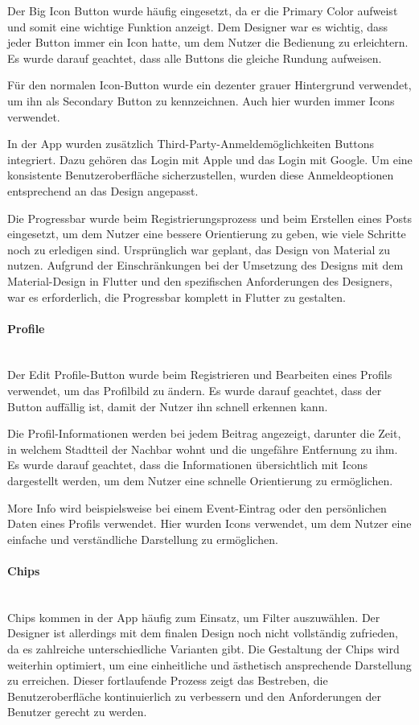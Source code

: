 Der Big Icon Button wurde häufig eingesetzt, da er die Primary Color aufweist und somit eine wichtige Funktion anzeigt. Dem Designer war es wichtig, dass jeder Button immer ein Icon hatte, um dem Nutzer die Bedienung zu erleichtern. Es wurde darauf geachtet, dass alle Buttons die gleiche Rundung aufweisen.

Für den normalen Icon-Button wurde ein dezenter grauer Hintergrund verwendet, um ihn als Secondary Button zu kennzeichnen. Auch hier wurden immer Icons verwendet.

In der App wurden zusätzlich Third-Party-Anmeldemöglichkeiten Buttons integriert. Dazu gehören das Login mit Apple und das Login mit Google. Um eine konsistente Benutzeroberfläche sicherzustellen, wurden diese Anmeldeoptionen entsprechend an das Design angepasst.

Die Progressbar wurde beim Registrierungsprozess und beim
Erstellen eines Posts eingesetzt, um dem Nutzer eine bessere
Orientierung zu geben, wie viele Schritte noch zu erledigen
sind. Ursprünglich war geplant, das Design von Material zu
nutzen. Aufgrund der Einschränkungen bei der Umsetzung des
Designs mit dem Material-Design in Flutter und den spezifischen
Anforderungen des Designers, war es erforderlich, die
Progressbar komplett in Flutter zu gestalten.

\paragraph{Profile}\mbox{} \\
Der Edit Profile-Button wurde beim Registrieren und
Bearbeiten eines Profils verwendet, um das Profilbild
zu ändern. Es wurde darauf geachtet, dass der Button
auffällig ist, damit der Nutzer ihn schnell erkennen kann.

Die Profil-Informationen werden bei jedem Beitrag angezeigt,
darunter die Zeit, in welchem Stadtteil der Nachbar wohnt
und die ungefähre Entfernung zu ihm. Es wurde darauf
geachtet, dass die Informationen übersichtlich mit
Icons dargestellt werden, um dem Nutzer eine schnelle Orientierung
zu ermöglichen.

More Info wird beispielsweise bei einem Event-Eintrag oder
den persönlichen Daten eines Profils verwendet. Hier wurden
Icons verwendet, um dem Nutzer eine einfache und
verständliche Darstellung zu ermöglichen.

\paragraph{Chips}\mbox{} \\
Chips kommen in der App häufig zum Einsatz, um Filter auszuwählen. Der Designer ist allerdings mit dem finalen Design noch nicht vollständig zufrieden, da es zahlreiche unterschiedliche Varianten gibt. Die Gestaltung der Chips wird weiterhin optimiert, um eine einheitliche und ästhetisch ansprechende Darstellung zu erreichen. Dieser fortlaufende Prozess zeigt das Bestreben, die Benutzeroberfläche kontinuierlich zu verbessern und den Anforderungen der Benutzer gerecht zu werden.


